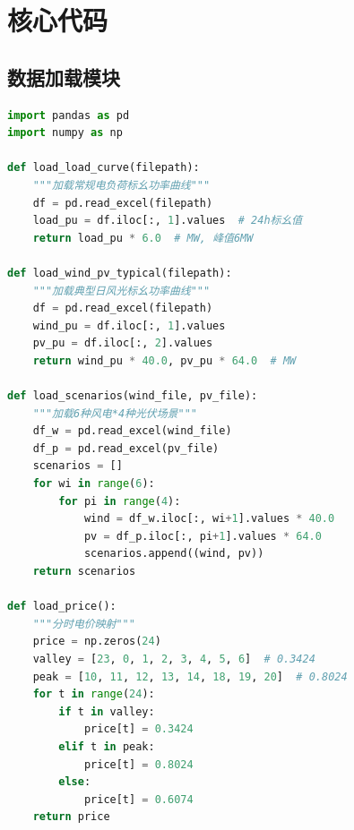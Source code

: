 \section{核心代码}

\subsection{数据加载模块}
\begin{lstlisting}[language=Python, basicstyle=\ttfamily\small, breaklines=true]
import pandas as pd
import numpy as np

def load_load_curve(filepath):
    """加载常规电负荷标幺功率曲线"""
    df = pd.read_excel(filepath)
    load_pu = df.iloc[:, 1].values  # 24h标幺值
    return load_pu * 6.0  # MW, 峰值6MW

def load_wind_pv_typical(filepath):
    """加载典型日风光标幺功率曲线"""
    df = pd.read_excel(filepath)
    wind_pu = df.iloc[:, 1].values
    pv_pu = df.iloc[:, 2].values
    return wind_pu * 40.0, pv_pu * 64.0  # MW

def load_scenarios(wind_file, pv_file):
    """加载6种风电*4种光伏场景"""
    df_w = pd.read_excel(wind_file)
    df_p = pd.read_excel(pv_file)
    scenarios = []
    for wi in range(6):
        for pi in range(4):
            wind = df_w.iloc[:, wi+1].values * 40.0
            pv = df_p.iloc[:, pi+1].values * 64.0
            scenarios.append((wind, pv))
    return scenarios

def load_price():
    """分时电价映射"""
    price = np.zeros(24)
    valley = [23, 0, 1, 2, 3, 4, 5, 6]  # 0.3424
    peak = [10, 11, 12, 13, 14, 18, 19, 20]  # 0.8024
    for t in range(24):
        if t in valley:
            price[t] = 0.3424
        elif t in peak:
            price[t] = 0.8024
        else:
            price[t] = 0.6074
    return price
\end{lstlisting}

